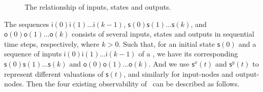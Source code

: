  \begin{figure}[!t]
      \centering
      
      \caption{The relationship of inputs, states and outputs.}
      \label{fig:10}
  \end{figure}
   The sequences $\mathsf{i}(0)\mathsf{i}(1)\ldots\mathsf{i}(k-1)$,  $\mathsf{s}(0)\mathsf{s}(1)\ldots\mathsf{s}(k)$, and $\mathsf{o}(0)\mathsf{o}(1)\ldots\mathsf{o}(k)$ 
 consists of several inputs, states and outputs in sequential time steps,  respectively, where $k>0$. 
 Such that, for an initial state $\mathsf{s}(0)$ and a  sequence of inputs $\mathsf{i}(0)\mathsf{i}(1)\ldots\mathsf{i}(k-1)$ of a \BCN, we have its corresponding 
$\mathsf{s}(0)\mathsf{s}(1)\ldots\mathsf{s}(k)$ and $\mathsf{o}(0)\mathsf{o}(1)\ldots\mathsf{o}(k)$.  
And we use $\mathsf{s}^{x}(t)$ and $\mathsf{s}^{y}(t)$ to represent different valuations of $\mathsf{s}(t)$, and similarly for input-nodes and output-nodes. Then the four existing observability of \BCNs\ can be described as follows. 

